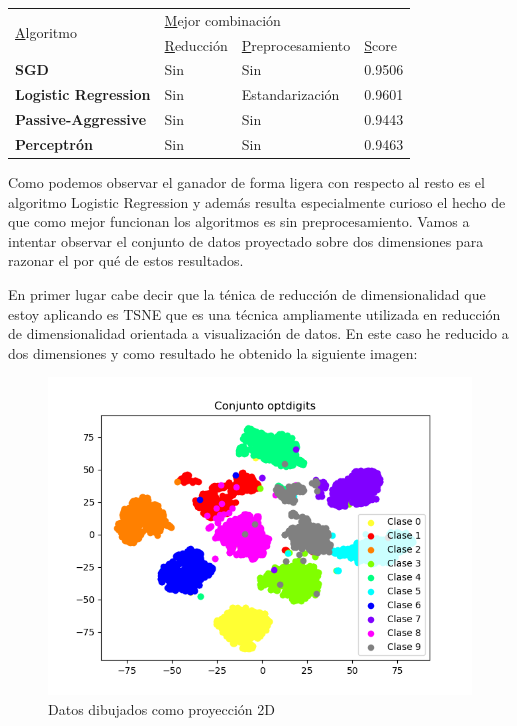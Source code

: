 \documentclass[12pt,a4paper]{article}
\begin{document}
\begin{table}[H]
	\begin{tabular}{|l|l|l|l|}
		\hline
		\multirow{2}{*}{{\ul Algoritmo}} & \multicolumn{3}{l|}{{\ul Mejor combinación}}           \\ \cline{2-4} 
		& {\ul Reducción} & {\ul Preprocesamiento} & {\ul Score} \\ \hline
		\textbf{SGD}                     & Sin             & Sin                    & 0.9506      \\ \hline
		\textbf{Logistic Regression}     & Sin             & Estandarización        & 0.9601      \\ \hline
		\textbf{Passive-Aggressive}      & Sin             & Sin                    & 0.9443      \\ \hline
		\textbf{Perceptrón}              & Sin             & Sin                    & 0.9463      \\ \hline
	\end{tabular}
\end{table}

Como podemos observar el ganador de forma ligera con respecto al resto es el algoritmo Logistic Regression y además resulta especialmente curioso el hecho de que como mejor funcionan los algoritmos es sin preprocesamiento. Vamos a intentar observar el conjunto de datos proyectado sobre dos dimensiones para razonar el por qué de estos resultados.

En primer lugar cabe decir que la ténica de reducción de dimensionalidad que estoy aplicando es TSNE que es una técnica ampliamente utilizada en reducción de dimensionalidad orientada a visualización de datos. En este caso he reducido a dos dimensiones y como resultado he obtenido la siguiente imagen:

\begin{figure}[H]
	\centering
	\includegraphics[scale=0.8]{./Imagenes/datos_tsne.png}
	\caption{Datos dibujados como proyección 2D}
\end{figure}
\end{document}
